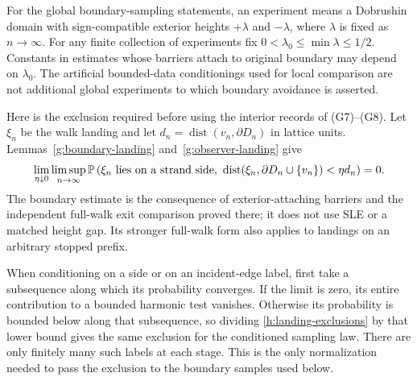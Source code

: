 For the global boundary-sampling statements, an experiment means a
Dobrushin domain with sign-compatible exterior heights
$+\lambda$ and $-\lambda$, where $\lambda$ is fixed as $n\to\infty$.
For any finite collection of experiments fix
$0<\lambda_0\le\min\lambda\le1/2$. Constants in estimates whose
barriers attach to original boundary may depend on $\lambda_0$.
The artificial bounded-data conditionings used for local comparison
are not additional global experiments to which boundary avoidance
is asserted.

Here is the exclusion required before using the interior records of
(G7)--(G8). Let $\xi_n$ be the walk landing and let
$d_n=\operatorname{dist}(v_n,\partial D_n)$ in lattice units.
Lemmas~\ref{g:boundary-landing} and~\ref{g:observer-landing} give
\begin{equation}\label{h:landing-exclusions}
 \lim_{\eta\downarrow0}\limsup_{n\to\infty}
 \mathbb P\left(\xi_n\hbox{ lies on a strand side},\
   \operatorname{dist}(\xi_n,\partial D_n\cup\{v_n\})<\eta d_n
       \right)=0.
\end{equation}
The boundary estimate is the consequence of exterior-attaching barriers
and the independent full-walk exit comparison proved there; it does
not use SLE or a matched height gap. Its stronger full-walk form
also applies to landings on an arbitrary stopped prefix.

When conditioning on a side or on an incident-edge label, first take
a subsequence along which its probability converges. If the limit is
zero, its entire contribution to a bounded harmonic test vanishes.
Otherwise its probability is bounded below along that subsequence,
so dividing \eqref{h:landing-exclusions} by that lower bound gives
the same exclusion for the conditioned sampling law. There are only
finitely many such labels at each stage. This is the only
normalization needed to pass the exclusion to the boundary samples
used below.

